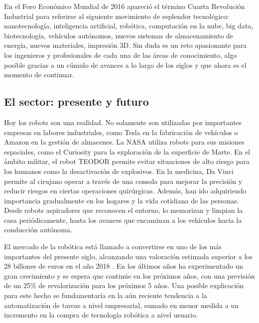 \documentclass[12pt,spanish,chapterprefix, numbers=noenddot]{book}
\numberwithin{equation}{section}
\numberwithin{figure}{section}
\begin{document}
En el Foro Económico Mundial de 2016 
\cite{forum_2016} apareció el término Cuarta Revolución Industrial para referirse al siguiente movimiento de esplendor tecnológico: nanotecnología, inteligencia artificial, robótica, computación en la nube, big data, biotecnología, vehículos autónomos, nuevos sistemas de almacenamiento de energía, nuevos materiales, impresión 3D. Sin duda es un reto apasionante para los ingenieros y profesionales de cada una de las áreas de conocimiento, algo posible gracias a un cúmulo de avances a lo largo de los siglos y que ahora es el momento de continuar. 


\subsection{El sector: presente y futuro}
Hoy los robots son una realidad. No solamente son utilizadas por importantes empresas en labores industriales, como Tesla en la fabricación de vehículos o Amazon en la gestión de almacenes. La NASA utiliza robots para sus misiones espaciales, como el Curiosity para la exploración de la superficie de Marte.  En el ámbito militar, el robot TEODOR permite evitar situaciones de alto riesgo para los humanos como la desactivación de explosivos. En la medicina, Da Vinci permite al cirujano operar a través de una consola para mejorar la precisión y reducir riesgos en ciertas operaciones quirúrgicas. Además, han ido adquiriendo importancia gradualmente en los hogares y la vida cotidiana de las personas. Desde robots aspiradores que reconocen el entorno, lo memorizan y limpian la casa periódicamente, hasta los avances que encaminan a los vehículos hacia la conducción autónoma. 

El mercado de la robótica está llamado a convertirse en uno de los más importantes del presente siglo, alcanzando una valoración estimada superior a los 28 billones de euros en el año 2018 \cite{robotics_market}. En los últimos años ha experimentado un gran crecimiento y se espera que continúe en los próximos años, con una previsión de un 25\% de revalorización para los próximos 5 años. 
Una posible explicación para este hecho se fundamentaría en la aún reciente tendencia a la automatización de tareas a nivel empresarial, sumado en menor medida a un incremento en la compra de tecnología robótica a nivel usuario.
\end{document}
